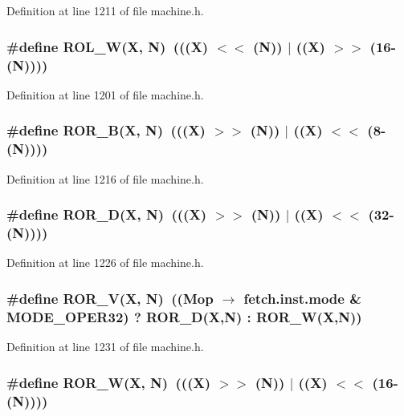 Definition at line 1211 of file machine.h.
\subsubsection[{ROL\_\-W}]{\setlength{\rightskip}{0pt plus 5cm}\#define ROL\_\-W(X, \/  N)~(((X) $<$$<$ (N)) $|$ ((X) $>$$>$ (16-(N))))}\label{machine_8h_5feea3a044c39b266d10b0363e5089dc}




Definition at line 1201 of file machine.h.
\subsubsection[{ROR\_\-B}]{\setlength{\rightskip}{0pt plus 5cm}\#define ROR\_\-B(X, \/  N)~(((X) $>$$>$ (N)) $|$ ((X) $<$$<$ (8-(N))))}\label{machine_8h_43327700446afc66250bb5200bab08ce}




Definition at line 1216 of file machine.h.
\subsubsection[{ROR\_\-D}]{\setlength{\rightskip}{0pt plus 5cm}\#define ROR\_\-D(X, \/  N)~(((X) $>$$>$ (N)) $|$ ((X) $<$$<$ (32-(N))))}\label{machine_8h_1051e624e531a22abb873ee80b411fae}




Definition at line 1226 of file machine.h.
\subsubsection[{ROR\_\-V}]{\setlength{\rightskip}{0pt plus 5cm}\#define ROR\_\-V(X, \/  N)~((Mop $\rightarrow$ fetch.inst.mode \& MODE\_\-OPER32) ? ROR\_\-D(X,N) : ROR\_\-W(X,N))}\label{machine_8h_5eec6e3983ca82350b0e83f5c22dd4b0}




Definition at line 1231 of file machine.h.
\subsubsection[{ROR\_\-W}]{\setlength{\rightskip}{0pt plus 5cm}\#define ROR\_\-W(X, \/  N)~(((X) $>$$>$ (N)) $|$ ((X) $<$$<$ (16-(N))))}\label{machine_8h_7ca47cffe077c84a985ad05a5a770ac5}




